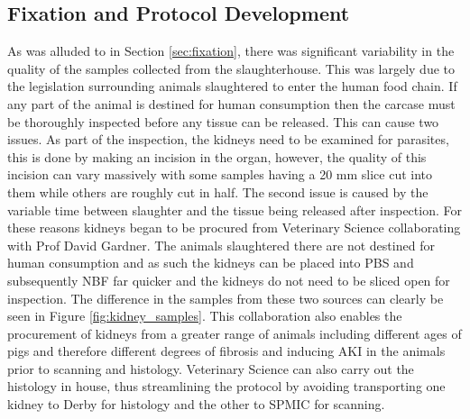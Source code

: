 \subsection{Fixation and Protocol Development}
As was alluded to in Section \ref{sec:fixation}, there was significant variability in the quality of the samples collected from the slaughterhouse. This was largely due to the legislation surrounding animals slaughtered to enter the human food chain. If any part of the animal is destined for human consumption then the carcase must be thoroughly inspected before any tissue can be released. This can cause two issues. As part of the inspection, the kidneys need to be examined for parasites, this is done by making an incision in the organ, however, the quality of this incision can vary massively with some samples having a 20 mm slice cut into them while others are roughly cut in half. The second issue is caused by the variable time between slaughter and the tissue being released after inspection. For these reasons kidneys began to be procured from Veterinary Science collaborating with Prof David Gardner. The animals slaughtered there are not destined for human consumption and as such the kidneys can be placed into \ac{PBS} and subsequently \ac{NBF} far quicker and the kidneys do not need to be sliced open for inspection. The difference in the samples from these two sources can clearly be seen in Figure \ref{fig:kidney_samples}. This collaboration also enables the procurement of kidneys from a greater range of animals including different ages of pigs and therefore different degrees of fibrosis and inducing \ac{AKI} in the animals prior to scanning and histology. Veterinary Science can also carry out the histology in house, thus streamlining the protocol by avoiding transporting one kidney to Derby for histology and the other to \ac{SPMIC} for scanning.

